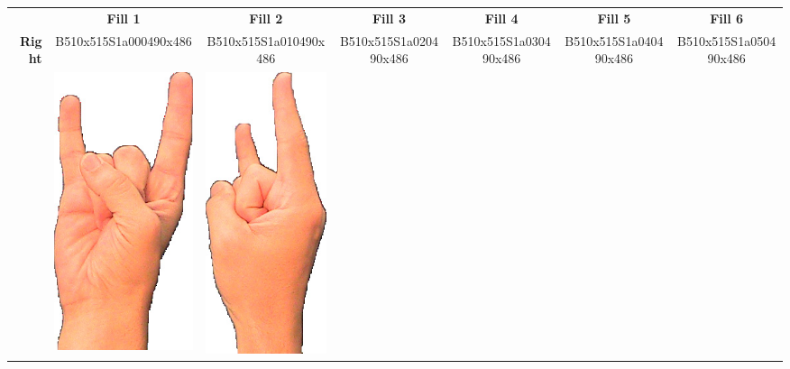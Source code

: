 \documentclass{article}
\begin{document}
\begin{center}
\begin{tabular}{r*{6}{c}}
&\textbf{Fill 1}&\textbf{Fill 2}&\textbf{Fill 3}&\textbf{Fill 4}&\textbf{Fill 5}&\textbf{Fill 6}\\
\multirow{2}{*}{\textbf{Right}}&
B510x515S1a000490x486&
B510x515S1a010490x486&
B510x515S1a020490x486&
B510x515S1a030490x486&
B510x515S1a040490x486&
B510x515S1a050490x486\\
&
\includegraphics[scale=0.1]{images/06-11-1.jpg}&
\includegraphics[scale=0.1]{images/06-11-2.jpg}&

\end{tabular}
\end{center}
\end{document}
